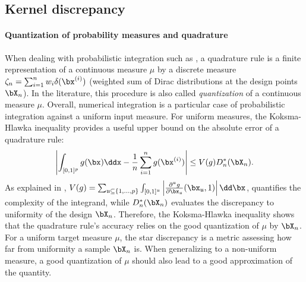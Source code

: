 \subsection{Kernel discrepancy}
\paragraph{Quantization of probability measures and quadrature}
When dealing with probabilistic integration such as , a quadrature rule is a finite representation of a continuous measure $\mu$ by a discrete measure $\zeta_n = \sum_{i=1}^n w_i \delta(\bx^{(i)})$ (weighted sum of Dirac distributions at the design points $\bX_n$). 
In the literature, this procedure is also called \emph{quantization} of a continuous measure $\mu$. 
Overall, numerical integration is a particular case of probabilistic integration against a uniform input measure. 
For uniform measures, the Koksma-Hlawka inequality \citep{morokoff_1995} provides a useful upper bound on the absolute error of a quadrature rule: 
\begin{equation}
    \left| \int_{[0, 1]^p} g(\bx) \ddx - \frac1n \sum_{i=1}^n g(\bx^{(i)})\right| \leq  V(g) D_n^*(\bX_n).
    \label{eq:KH_inequality}
\end{equation}
As explained in \cite{oates_21}, $V(g) = \sum_{\mathfrak{u}\subseteq\{1, \dots, p \}} \int_{[0, 1]^\mathfrak{u}} \left| \frac{\partial^{\mathfrak{u}}g}{\partial \bx_{\mathfrak{u}}}(\bx_{\mathfrak{u}}, 1)\right| \dd\bx$, quantifies the complexity of the integrand, while $D_n^*(\bX_n)$ evaluates the discrepancy to uniformity of the design $\bX_n$. 
Therefore, the Koksma-Hlawka inequality shows that the quadrature rule's accuracy relies on the good quantization of $\mu$ by $\bX_n$. For a uniform target measure $\mu$, the star discrepancy is a metric assessing how far from uniformity a sample $\bX_n$ is. 
When generalizing to a non-uniform measure, a good quantization of $\mu$ should also lead to a good approximation of the quantity. %

